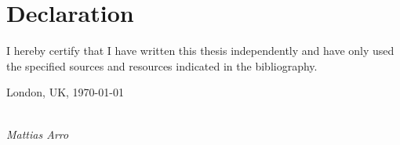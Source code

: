 \clearpage
\pagestyle{empty}
\chapter*{Declaration}




\vspace*{2cm}
\noindent
I hereby certify that I have written this thesis independently and have only used the specified sources and resources indicated in the bibliography.

\vspace{2cm}

\noindent
London, UK, \today

\vspace{3cm}

\hspace*{7cm}%
\dotfill\\
\hspace*{8.5cm}%
\textit{Mattias Arro}

